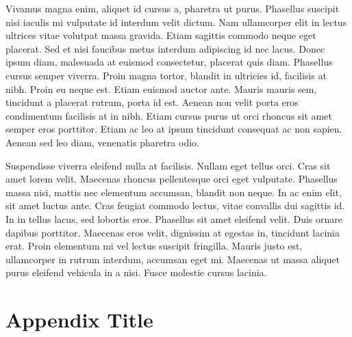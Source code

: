 \documentclass[draft,jgrga]{AGUTeX}
\begin{document}
\begin{article}
Vivamus magna enim, aliquet id cursus a, pharetra ut purus. Phasellus suscipit nisi iaculis mi vulputate id interdum velit dictum. Nam ullamcorper elit in lectus ultrices vitae volutpat massa gravida. Etiam sagittis commodo neque eget placerat. Sed et nisi faucibus metus interdum adipiscing id nec lacus. Donec ipsum diam, malesuada at euismod consectetur, placerat quis diam. Phasellus cursus semper viverra. Proin magna tortor, blandit in ultricies id, facilisis at nibh. Proin eu neque est. Etiam euismod auctor ante. Mauris mauris sem, tincidunt a placerat rutrum, porta id est. Aenean non velit porta eros condimentum facilisis at in nibh. Etiam cursus purus ut orci rhoncus sit amet semper eros porttitor. Etiam ac leo at ipsum tincidunt consequat ac non sapien. Aenean sed leo diam, venenatis pharetra odio.

Suspendisse viverra eleifend nulla at facilisis. Nullam eget tellus orci. Cras sit amet lorem velit. Maecenas rhoncus pellentesque orci eget vulputate. Phasellus massa nisi, mattis nec elementum accumsan, blandit non neque. In ac enim elit, sit amet luctus ante. Cras feugiat commodo lectus, vitae convallis dui sagittis id. In in tellus lacus, sed lobortis eros. Phasellus sit amet eleifend velit. Duis ornare dapibus porttitor. Maecenas eros velit, dignissim at egestas in, tincidunt lacinia erat. Proin elementum mi vel lectus suscipit fringilla. Mauris justo est, ullamcorper in rutrum interdum, accumsan eget mi. Maecenas ut massa aliquet purus eleifend vehicula in a nisi. Fusce molestie cursus lacinia.





\appendix

\section{Appendix Title}


\end{article}
\end{document}
